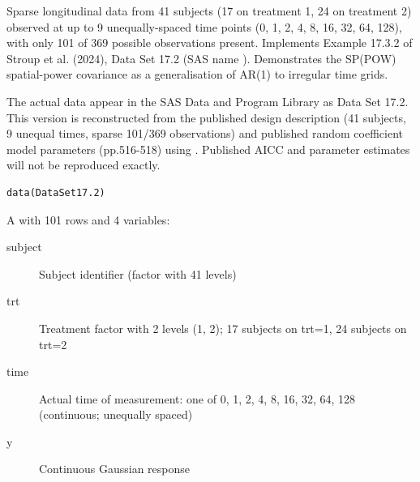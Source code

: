 \documentclass[a4paper]{book}
\begin{document}
%
\begin{SeeAlso}
\end{SeeAlso}
%
\begin{Examples}
\end{Examples}
%
\begin{Description}
Sparse longitudinal data from 41 subjects (17 on treatment 1, 24 on
treatment 2) observed at up to 9 unequally-spaced time points
(0, 1, 2, 4, 8, 16, 32, 64, 128), with only 101 of 369 possible
observations present.  Implements Example 17.3.2 of Stroup et al. (2024),
Data Set 17.2 (SAS name ).  Demonstrates the SP(POW) spatial-power
covariance as a generalisation of AR(1) to irregular time grids.

 The actual data appear in the SAS Data and
Program Library as Data Set 17.2.  This version is reconstructed from the
published design description (41 subjects, 9 unequal times, sparse 101/369
observations) and published random coefficient model parameters (pp.516-518)
using .  Published AICC and parameter estimates will
not be reproduced exactly.
\end{Description}
%
\begin{Usage}
\begin{verbatim}
data(DataSet17.2)
\end{verbatim}
\end{Usage}
%
\begin{Format}
A  with 101 rows and 4 variables:
\begin{description}

\item[subject] Subject identifier (factor with 41 levels)
\item[trt] Treatment factor with 2 levels (1, 2);
17 subjects on trt=1, 24 subjects on trt=2
\item[time] Actual time of measurement: one of 0, 1, 2, 4, 8, 16, 32,
64, 128 (continuous; unequally spaced)
\item[y] Continuous Gaussian response

\end{description}

\end{Format}
\end{document}
